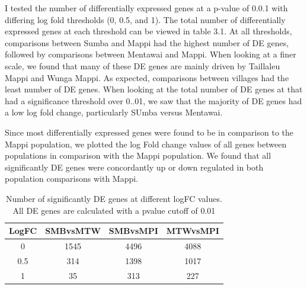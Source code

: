 \documentclass[12pt,a4paper,titlepage,twoside,openright]{book}
\begin{document}
\begin{mainmatter}
{{I tested the number of differentially expressed genes at a p-value of 0.0.1 with differing log fold thresholds (0, 0.5, and 1). The total number of differentially expressed genes at each threshold can be viewed in table 3.1. At all thresholds, comparisons between Sumba and Mappi had the highest number of DE genes, followed by comparisons between Mentawai and Mappi. When looking at a finer scale, we found that many of these DE genes are mainly driven by Taillaleu Mappi and Wunga Mappi. As expected, comparisons between villages had the least number of DE genes. When looking at the total number of DE genes at that had a significance threshold over 0..01, we saw that the majority of DE genes had a low log fold change, particularly SUmba versus Mentawai. 

Since most differentially expressed genes were found to be in comparison to the Mappi population, we plotted the log Fold change values of all genes between populations in comparison with the Mappi population. We found that all significantly DE genes were concordantly up or down regulated in both population comparisons with Mappi. 

\begin{table}[htb!]
\caption{Number of significantly DE genes at different logFC values. All DE genes are calculated with a pvalue cutoff of 0.01}
\centering
\begin{tabular}{c c c c}
\hline\hline 
LogFC & SMBvsMTW & SMBvsMPI & MTWvsMPI \\ [0.5ex] 
\hline
0 & 1545 & 4496 & 4088 \\ 
\hline
0.5 & 314 & 1398 & 1017 \\
\hline
1 & 35 & 313 & 227 \\
\hline
\end{tabular}
\label{table:LogFC THresholds}
\end{table}

}}
\end{mainmatter}
\end{document}
